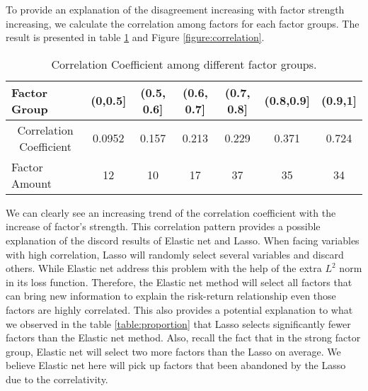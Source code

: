 To provide an explanation of the disagreement increasing with factor strength increasing, we calculate the correlation among factors for each factor groups.
The result is presented in table \ref{table:Correlation} and Figure \ref{figure:correlation}.
\begin{table}[h]
	\centering
	\caption{Correlation Coefficient among different factor groups. }
	\label{table:Correlation}
	\begin{tabular}{l|cccccc}
		\hline
		\hline
		Factor Group                                 & (0,0.5{]} & (0.5, 0.6{]} & (0.6, 0.7{]} & (0.7, 0.8{]} & (0.8,0.9{]} & (0.9,1{]} \\ \hline
		\multicolumn{1}{c|}{Correlation Coefficient} & 0.0952    & 0.157        & 0.213        & 0.229        & 0.371       & 0.724   \\
		Factor Amount &12 & 10 &  17 & 37& 35 &34  \\ \hline \hline
	\end{tabular}
\end{table}
We can clearly see an increasing trend of the correlation coefficient with the increase of factor's strength.
This correlation pattern provides a possible explanation of the discord results of Elastic net and Lasso.
When facing variables with high correlation, Lasso will randomly select several variables and discard others.
While Elastic net address this problem with the help of the extra $L^2$ norm in its loss function.
Therefore, the Elastic net method will select all factors that can bring new information to explain the risk-return relationship even those factors are highly correlated.
This also provides a potential explanation to what we observed in the table \ref{table:proportion}  that Lasso selects significantly fewer factors than the Elastic net method.
Also, recall the fact that in the strong factor group, Elastic net will select two more factors than the Lasso on average.
We believe Elastic net here will pick up factors that been abandoned by the Lasso due to the correlativity.
